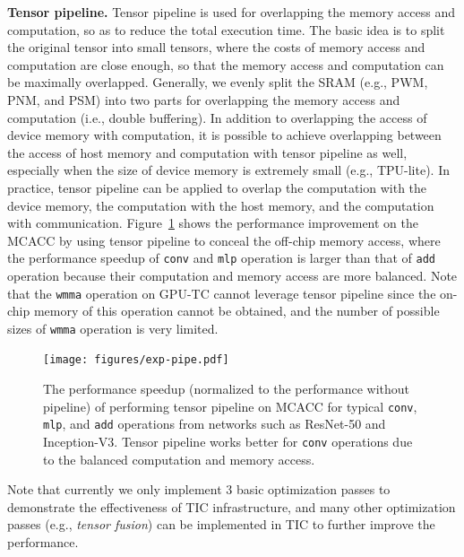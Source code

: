 \textbf{Tensor pipeline.} Tensor pipeline is used for overlapping the memory access and computation, so as to reduce the total execution time. The basic idea is to split the original tensor into small tensors, where the costs of memory access and computation are close enough, so that the memory access and computation can be maximally overlapped. Generally, we evenly split the SRAM (e.g., PWM, PNM, and PSM) into two parts for overlapping the memory access and computation (i.e., double buffering). In addition to overlapping the access of device memory with computation, it is possible to achieve overlapping between the access of host memory and computation with tensor pipeline as well, especially when the size of device memory is extremely small (e.g., TPU-lite). In practice, tensor pipeline can be applied to overlap the computation with the device memory, the computation with the host memory, and the computation with communication. Figure~\ref{fig:exp-pipe} shows the performance improvement on the MCACC by using tensor pipeline to conceal the off-chip memory access, where the performance speedup of \texttt{conv} and \texttt{mlp} operation is larger than that of \texttt{add} operation because their computation and memory access are more balanced. Note that the \texttt{wmma} operation on GPU-TC cannot leverage tensor pipeline since the on-chip memory of this operation cannot be obtained, and the number of possible sizes of \texttt{wmma} operation is very limited. 


\begin{figure}
\centering
\texttt{[image: figures/exp-pipe.pdf]}
\vspace{-10pt}
\caption{\footnotesize The performance speedup (normalized to the performance without pipeline) of performing tensor pipeline on MCACC for typical \texttt{conv}, \texttt{mlp}, and \texttt{add} operations from networks such as ResNet-50 and Inception-V3. Tensor pipeline works better for \texttt{conv} operations due to the balanced computation and memory access.}
\label{fig:exp-pipe}
\vspace{-15pt}
\end{figure}

Note that currently we only implement $3$ basic optimization passes to demonstrate the effectiveness of TIC infrastructure, and many other optimization passes (e.g., \emph{tensor fusion}) can be implemented in TIC to further improve the performance.

